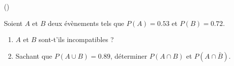 \begin{exercice}\label{exo3-4} (\coolexo)

Soient $A$ et $B$ deux \'ev\`enements tels que $P(A) = 0.53$ et $P(B)=0.72$.

\begin{enumerate}

\item $A$ et $B$ sont-t'ils incompatibles ?

\item Sachant que $P(A \cup B) = 0.89$, d\'eterminer $P(A \cap B)$ et $P(A \cap \bar{B})$.

\end{enumerate}

\end{exercice}
